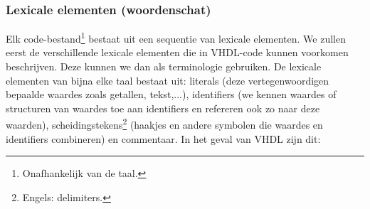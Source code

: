 \subsubsection{Lexicale elementen (woordenschat)}
Elk code-bestand\footnote{Onafhankelijk van de taal.} bestaat uit een sequentie van lexicale elementen. We zullen eerst de verschillende lexicale elementen die in VHDL-code kunnen voorkomen beschrijven. Deze kunnen we dan als terminologie gebruiken. De lexicale elementen van bijna elke taal bestaat uit: literals (deze vertegenwoordigen bepaalde waardes zoals getallen, tekst,...), identifiers (we kennen waardes of structuren van waardes toe aan identifiers en refereren ook zo naar deze waarden), scheidingstekens\footnote{Engels: delimiters.} (haakjes en andere symbolen die waardes en identifiers combineren) en commentaar. In het geval van VHDL zijn dit:
